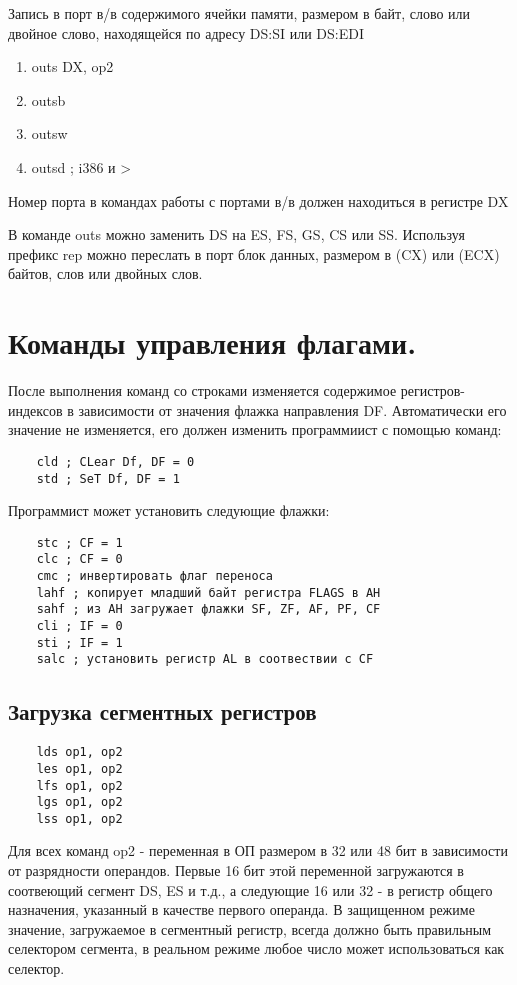 Запись в порт в/в содержимого ячейки памяти, размером в байт, слово или двойное слово, находящейся по адресу DS:SI или DS:EDI
\begin{enumerate}
    \item outs DX, op2
    \item outsb
    \item outsw
    \item outsd ; i386 и >
\end{enumerate}

Номер порта в командах работы с портами в/в должен находиться в регистре DX

В команде outs можно заменить DS на ES, FS, GS, CS или SS. Используя префикс rep можно переслать в порт блок данных, размером в (CX) или (ECX) байтов, слов или двойных слов.

\section{Команды управления флагами.}

После выполнения команд со строками изменяется содержимое регистров-индексов в зависимости от значения флажка направления DF. Автоматически его значение не изменяется, его должен изменить программиист с помощью команд:
\begin{verbatim}
    cld ; CLear Df, DF = 0
    std ; SeT Df, DF = 1
\end{verbatim}
Программист может установить следующие флажки:
\begin{verbatim}
    stc ; CF = 1
    clc ; CF = 0
    cmc ; инвертировать флаг переноса
    lahf ; копирует младший байт регистра FLAGS в AH
    sahf ; из AH загружает флажки SF, ZF, AF, PF, CF
    cli ; IF = 0
    sti ; IF = 1
    salc ; установить регистр AL в соотвествии с CF
\end{verbatim}

\subsection{Загрузка сегментных регистров}
\begin{verbatim}
    lds op1, op2
    les op1, op2
    lfs op1, op2
    lgs op1, op2
    lss op1, op2
\end{verbatim}

Для всех команд op2 - переменная в ОП размером в 32 или 48 бит в зависимости от разрядности операндов. Первые 16 бит этой переменной загружаются в соотвеющий сегмент DS, ES и т.д., а следующие 16 или 32 - в регистр общего назначения,
указанный в качестве первого операнда. В защищенном режиме значение, загружаемое в сегментный регистр, всегда должно быть правильным селектором сегмента, в реальном режиме любое число может использоваться как селектор.

